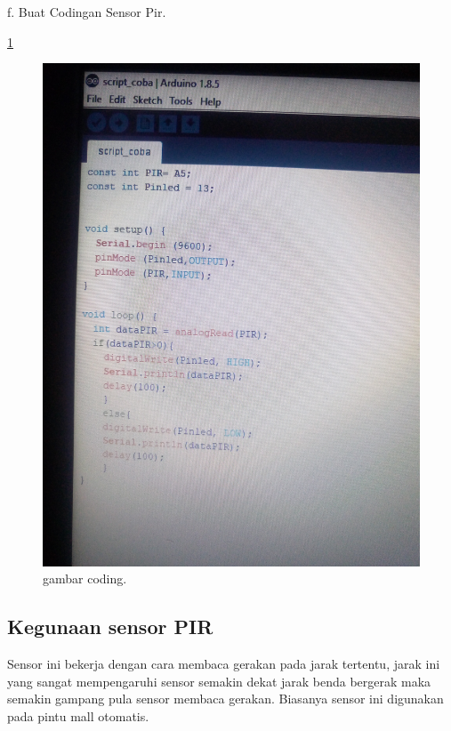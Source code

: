 f. Buat Codingan Sensor Pir.

\ref{coding}

\begin{figure} [ht]
\centerline{\includegraphics[width=1\textwidth]{figures/coding.JPG}}
\caption{gambar coding.}
\label{coding}
\end{figure}

\subsection {Kegunaan sensor PIR}
Sensor ini bekerja dengan cara membaca gerakan pada jarak tertentu, jarak ini yang sangat mempengaruhi sensor semakin dekat jarak benda bergerak maka semakin gampang pula sensor membaca gerakan.
Biasanya sensor ini digunakan pada pintu mall otomatis.
